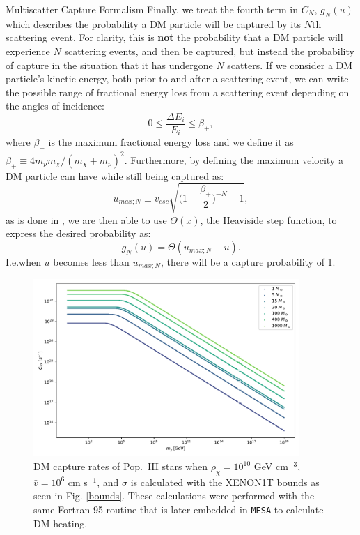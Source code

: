 \documentclass[a4paper,11pt]{article}
\begin{document}
\begin{section}{Multiscatter Capture Formalism}
    Finally, we treat the fourth term in $C_N$, $g_N(u)$ which describes the probability a DM particle will be captured by its $N$th scattering event.
    For clarity, this is \textbf{not} the probability that a DM particle will experience $N$ scattering events, and then be captured, but instead the probability of capture in the situation that it has undergone $N$ scatters. 
    If we consider a DM particle's kinetic energy, both prior to and after a scattering event, we can write the possible range of fractional energy loss from a scattering event depending on the angles of incidence:
    \begin{equation}
    0 \leq \frac{\Delta E_i}{E_i} \leq \beta_+,
    \end{equation}
    where $\beta_+$ is the maximum fractional energy loss and we define it as $\beta_+ \equiv 4m_p m_{\chi}/(m_{\chi} + m_p)^2$. 
    Furthermore, by defining the maximum velocity a DM particle can have while still being captured as:
    \begin{equation}
    u_{max;N} \equiv v_{esc} \sqrt{\Big(1- \frac{\beta_+}{2}\Big)^{-N} - 1},
    \end{equation}
    as is done in \cite{Bramante:2017}, we are then able to use $\Theta(x)$, the Heaviside step function, to express the desired probability as:
    \begin{equation}
    g_N(u) = \Theta(u_{max;N} - u).
    \end{equation}
    I.e.\text{ }when $u$ becomes less than $u_{max;N}$, there will be a capture probability of 1.

    \begin{figure}
        \centering
        \includegraphics[width=0.9\textwidth]{Ctot1.pdf}
        \caption{DM capture rates of Pop.~III stars when $\rho_\chi = 10^{10}$ GeV cm$^{-3}$, $\bar{v} = 10^6$ cm s$^{-1}$, and $\sigma$ is calculated with the XENON1T bounds as seen in Fig. \ref{bounds}. These calculations were performed with the same Fortran 95 routine that is later embedded in \texttt{MESA} to calculate DM heating.}
    \end{figure}


\end{section}
\end{document}
